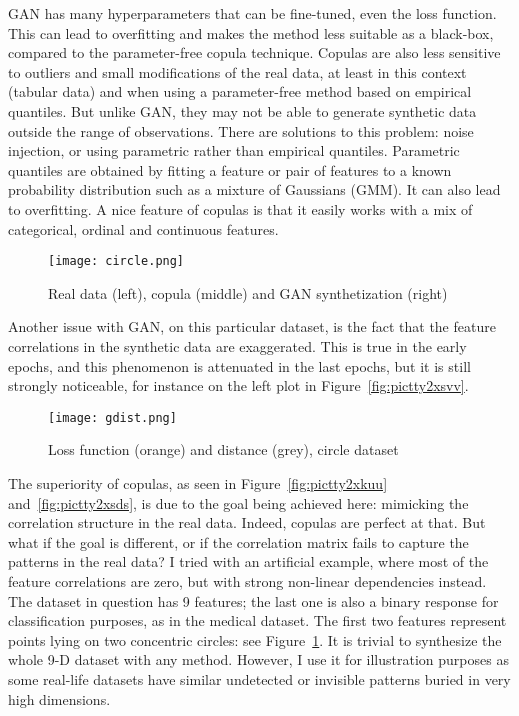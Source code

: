 \documentclass[oneside,10pt]{book}
\begin{document}
GAN has  many hyperparameters that can be fine-tuned, even the loss function. This can lead to overfitting and makes the method less suitable as a black-box, compared to the parameter-free copula technique. Copulas are also less sensitive to outliers and small modifications of the real data, at least in this context (tabular data) and when using a parameter-free method based on empirical quantiles. But unlike GAN, they may not be able to generate synthetic data outside the range of observations.
There are solutions to this problem: noise injection, or using parametric rather than empirical quantiles. Parametric quantiles are obtained by fitting a feature or pair of features to a known probability distribution such as a mixture of Gaussians (GMM). It can also lead to overfitting.
A nice feature of copulas is that it easily works with a mix of categorical, ordinal and continuous features.

\begin{figure}[H]
\centering
\texttt{[image: circle.png]}
\caption{Real data (left), copula (middle) and GAN synthetization (right)}
\label{fig:pictty2xsuu}
\end{figure}

Another issue with GAN, on this particular dataset, is the fact that the feature correlations in the synthetic data are exaggerated. This is true in the early epochs, and this phenomenon is attenuated in the last epochs, but it is still strongly noticeable, for instance on the left plot in Figure~\ref{fig:pictty2xsvv}.


\begin{figure}[H]
\centering
\texttt{[image: gdist.png]}
\caption{Loss function (orange) and distance (grey), circle dataset}
\label{fig:pictty2xsvvdd}
\end{figure}

The superiority of copulas, as seen in Figure~\ref{fig:pictty2xkuu} and~\ref{fig:pictty2xsds}, is due to the goal being achieved here: mimicking the correlation structure in the real data. Indeed, copulas are perfect at that. But what if the goal is different, or if the correlation matrix fails to capture the patterns in the real data? I tried with an artificial example, where most of the feature correlations are zero, but with strong non-linear dependencies instead. The dataset in question has 9 features; the last one is also a binary response for classification purposes, as in
 the medical dataset. The first two features represent points lying on two concentric circles: see Figure~\ref{fig:pictty2xsuu}. It is trivial to synthesize the whole 9-D dataset with any method. However, I use it for illustration purposes as some real-life datasets  have
 similar undetected or invisible patterns buried in very high dimensions.
\end{document}
